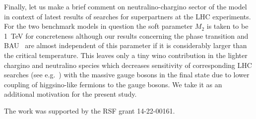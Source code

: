 \documentclass[12pt]{article}
\begin{document}
Finally, let us make a brief comment on neutralino-chargino sector of
the model in context of latest results of searches for superpartners
at the LHC experiments. For the two benchmark models in question the
soft parameter $M_2$ is taken to be 1~TeV for concreteness although our
results concerning the phase transition and BAU~\cite{Demidov:2016wcv} are almost
independent of this parameter if it is considerably larger than the
critical temperature. This leaves only a tiny wino contribution in the
lighter chargino and neutralino species which decreases sensitivity of
corresponding LHC searches (see e.g.~\cite{atlas_conf}) with the
massive gauge bosons in the final state due to lower coupling of
higgsino-like fermions to the gauge bosons. We take it as an
additional motivation for the present study.


\vskip 0.3cm 
The work was supported by the RSF grant 14-22-00161.
\end{document}
